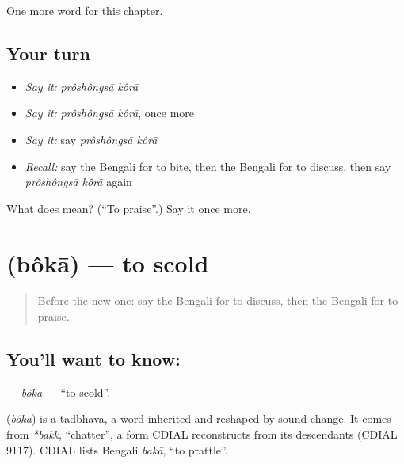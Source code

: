 \begin{grammarlens}[title={What you've built}]
One more word for this chapter.
\end{grammarlens}

\subsection*{Your turn}
\begin{itemize}
\raggedright
  \item \emph{Say it:} \emph{prôshôngsā kôrā}
  \item \emph{Say it:} \emph{prôshôngsā kôrā}, once more
  \item \emph{Say it:} say \emph{prôshôngsā kôrā}
  \item \emph{Recall:} say the Bengali for to bite, then the Bengali for to discuss, then say \emph{prôshôngsā kôrā} again
\end{itemize}

\begin{tcolorbox}[breakable,colback=teal!4,colframe=teal!35!black,title={Before you move on}]
What does   mean? (\textquotedblleft{}To praise\textquotedblright{}.) Say it once more.
\end{tcolorbox}
\section[\texorpdfstring{\bn{বকা} (bôkā)}{বকা (bôkā)}]{ (bôkā) — to scold}

\label{lesson:BN-C153-boka}



\begin{quote}
Before the new one: say the Bengali for to discuss, then the Bengali for to praise.
\end{quote}

\subsection*{You'll want to know: }
\textbf{} — \emph{bôkā} — \textquotedblleft{}to scold\textquotedblright{}.

\begin{cousinweb}
\textbf{} (\emph{bôkā}) is a tadbhava, a word inherited and reshaped by sound change. It comes from \emph{*bakk}, \textquotedblleft{}chatter\textquotedblright{}, a form CDIAL reconstructs from its descendants (CDIAL 9117). CDIAL lists Bengali \emph{bakā}, \textquotedblleft{}to prattle\textquotedblright{}.
\end{cousinweb}

